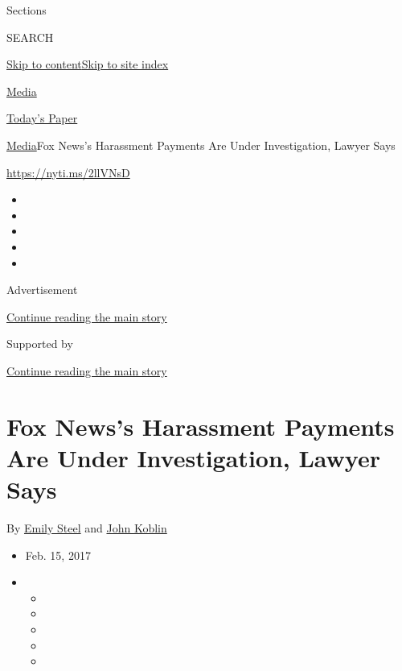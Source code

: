 Sections

SEARCH

\protect\hyperlink{site-content}{Skip to
content}\protect\hyperlink{site-index}{Skip to site index}

\href{https://www.nytimes3xbfgragh.onion/section/business/media}{Media}

\href{https://myaccount.nytimes3xbfgragh.onion/auth/login?response_type=cookie\&client_id=vi}{}

\href{https://www.nytimes3xbfgragh.onion/section/todayspaper}{Today's
Paper}

\href{/section/business/media}{Media}\textbar{}Fox News's Harassment
Payments Are Under Investigation, Lawyer Says

\url{https://nyti.ms/2llVNsD}

\begin{itemize}
\item
\item
\item
\item
\item
\end{itemize}

Advertisement

\protect\hyperlink{after-top}{Continue reading the main story}

Supported by

\protect\hyperlink{after-sponsor}{Continue reading the main story}

\hypertarget{fox-newss-harassment-payments-are-under-investigation-lawyer-says}{%
\section{Fox News's Harassment Payments Are Under Investigation, Lawyer
Says}\label{fox-newss-harassment-payments-are-under-investigation-lawyer-says}}

By \href{https://www.nytimes3xbfgragh.onion/by/emily-steel}{Emily Steel}
and \href{https://www.nytimes3xbfgragh.onion/by/john-koblin}{John
Koblin}

\begin{itemize}
\item
  Feb. 15, 2017
\item
  \begin{itemize}
  \item
  \item
  \item
  \item
  \item
  \end{itemize}
\end{itemize}

